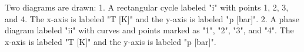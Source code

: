 Two diagrams are drawn:  
1. A rectangular cycle labeled "i" with points 1, 2, 3, and 4. The x-axis is labeled "T [K]" and the y-axis is labeled "p [bar]".  
2. A phase diagram labeled "ii" with curves and points marked as "1", "2", "3", and "4". The x-axis is labeled "T [K]" and the y-axis is labeled "p [bar]".